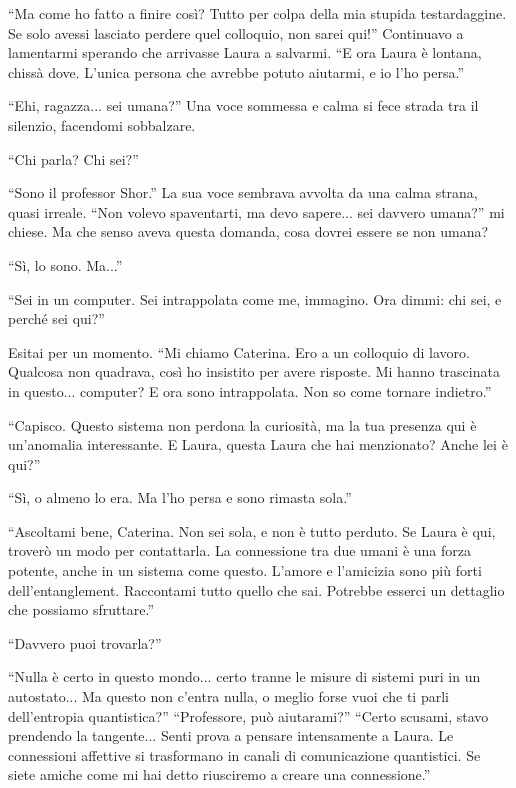 \begin{dialogue}
 \enquote{Ma come ho fatto a finire così? Tutto per colpa della mia stupida testardaggine. Se solo avessi lasciato perdere quel colloquio, non sarei qui!} Continuavo a lamentarmi sperando che arrivasse Laura a salvarmi. \enquote{E ora Laura è lontana, chissà dove. L'unica persona che avrebbe potuto aiutarmi, e io l'ho persa.}

 \enquote{Ehi, ragazza... sei umana?} Una voce sommessa e calma si fece strada tra il silenzio, facendomi sobbalzare.

 \enquote{Chi parla? Chi sei?}

 \enquote{Sono il professor Shor.} La sua voce sembrava avvolta da una calma strana, quasi irreale. \enquote{Non volevo spaventarti, ma devo sapere... sei davvero umana?} mi chiese. Ma che senso aveva questa domanda, cosa dovrei essere se non umana?

 \enquote{Sì, lo sono. Ma...} 

 \enquote{Sei in un computer. Sei intrappolata come me, immagino. Ora dimmi: chi sei, e perché sei qui?}

 Esitai per un momento. \enquote{Mi chiamo Caterina. Ero a un colloquio di lavoro. Qualcosa non quadrava, così ho insistito per avere risposte. Mi hanno trascinata in questo... computer? E ora sono intrappolata. Non so come tornare indietro.}

 \enquote{Capisco. Questo sistema non perdona la curiosità, ma la tua presenza qui è un'anomalia interessante. E Laura, questa Laura che hai menzionato? Anche lei è qui?}

 \enquote{Sì, o almeno lo era. Ma l'ho persa e sono rimasta sola.}

 \enquote{Ascoltami bene, Caterina. Non sei sola, e non è tutto perduto. Se Laura è qui, troverò un modo per contattarla. La connessione tra due umani è una forza potente, anche in un sistema come questo. L'amore e l'amicizia sono più forti dell'entanglement. Raccontami tutto quello che sai. Potrebbe esserci un dettaglio che possiamo sfruttare.}

 \enquote{Davvero puoi trovarla?}

 \enquote{Nulla è certo in questo mondo... certo tranne le misure di sistemi puri in un autostato... Ma questo non c'entra nulla, o meglio forse vuoi che ti parli dell'entropia quantistica?}
 \enquote{Professore, può aiutarami?}
 \enquote{Certo scusami, stavo prendendo la tangente... Senti prova a pensare intensamente a Laura. Le connessioni affettive si trasformano in canali di comunicazione quantistici. Se siete amiche come mi hai detto riusciremo a creare una connessione.}
\end{dialogue}

